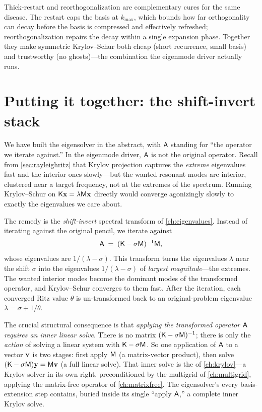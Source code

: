 Thick-restart and reorthogonalization are complementary cures for the same disease. The restart
caps the basis at $k_{\max}$, which bounds how far orthogonality can decay before the basis is
compressed and effectively refreshed; reorthogonalization repairs the decay within a single
expansion phase. Together they make symmetric Krylov--Schur both cheap (short recurrence, small
basis) and trustworthy (no ghosts)---the combination the eigenmode driver actually runs.

\section{Putting it together: the shift-invert stack}
\label{sec:shiftinvert}

We have built the eigensolver in the abstract, with $\mathsf{A}$ standing for ``the operator we
iterate against.'' In the eigenmode driver, $\mathsf{A}$ is not the original operator. Recall from
\cref{sec:rayleighritz} that Krylov projection captures the \emph{extreme} eigenvalues fast and
the interior ones slowly---but the wanted resonant modes are interior, clustered near a target
frequency, not at the extremes of the spectrum. Running Krylov--Schur on $\mathsf{K}\mathbf{x} = \lambda
\mathsf{M}\mathbf{x}$ directly would converge agonizingly slowly to exactly the eigenvalues we care about.

The remedy is the \emph{shift-invert} spectral transform of \cref{ch:eigenvalues}. Instead of
iterating against the original pencil, we iterate against
\[
  \mathsf{A} \;=\; (\mathsf{K} - \sigma\mathsf{M})^{-1}\mathsf{M},
\]
whose eigenvalues are $1/(\lambda - \sigma)$. This transform turns the eigenvalues $\lambda$ near
the shift $\sigma$ into the eigenvalues $1/(\lambda - \sigma)$ of \emph{largest magnitude}---the
extremes. The wanted interior modes become the dominant modes of the transformed operator, and
Krylov--Schur converges to them fast. After the iteration, each converged Ritz value $\theta$ is
un-transformed back to an original-problem eigenvalue $\lambda = \sigma + 1/\theta$.

The crucial structural consequence is that \emph{applying the transformed operator $\mathsf{A}$
requires an inner linear solve}. There is no matrix $(\mathsf{K} - \sigma\mathsf{M})^{-1}$; there is only
the \emph{action} of solving a linear system with $\mathsf{K} - \sigma\mathsf{M}$. So one application of
$\mathsf{A}$ to a vector $\mathbf{v}$ is two stages: first apply $\mathsf{M}$ (a matrix-vector product), then
solve $(\mathsf{K} - \sigma\mathsf{M})\mathbf{y} = \mathsf{M}\mathbf{v}$ (a full linear solve). That inner solve is the
 of \cref{ch:krylov}---a Krylov solver in its own right, preconditioned by the
multigrid of \cref{ch:multigrid}, applying the matrix-free operator of \cref{ch:matrixfree}. The
eigensolver's every basis-extension step contains, buried inside its single ``apply $\mathsf{A}$,'' a
complete inner Krylov solve.


